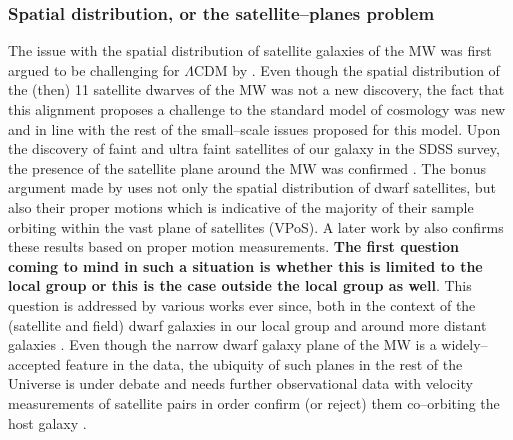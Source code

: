 \documentclass[paper=a4, fontsize=11pt]{scrartcl} %
\numberwithin{equation}{section} %
\numberwithin{figure}{section} %
\numberwithin{table}{section} %
\begin{document}





\subsubsection{Spatial distribution, or the satellite--planes problem}
The issue with the spatial distribution of satellite galaxies of the MW was first argued to be challenging for $\Lambda$CDM by \citet[][]{Ktoupa+2005}. Even though the spatial distribution of the (then) 11 satellite dwarves of the MW was not a new discovery, the fact that this alignment proposes a challenge to the standard model of cosmology was new and in line with the rest of the small--scale issues proposed for this model. Upon the discovery of faint and ultra faint satellites of our galaxy in the SDSS survey, the presence of the satellite plane around the MW was confirmed \citep[][]{Metz+2009, Kroupa+2010}. The bonus argument made by \citet[][]{Metz+2009} uses not only the spatial distribution of dwarf satellites, but also their proper motions which is indicative of the majority of their sample orbiting within the vast plane of satellites (VPoS). A later work by \citet[][]{Pawlowski+2013} also confirms these results based on proper motion measurements. {\bf The first question coming to mind in such a situation is whether this is limited to the local group or this is the case outside the local group as well}. This question is addressed by various works ever since, both in the context of the (satellite and field) dwarf galaxies in our local group \citep[see e.g. ][]{Ibata+2013, Pawlowski+2013, Bellazzini+2013, Pawlowski.McGaugh2014a} and around more distant galaxies \citep[see e.g. ][]{Tully+2015, Muller+2015}. Even though the narrow dwarf galaxy plane of the MW is a widely--accepted feature in the data, the ubiquity of such planes in the rest of the Universe is under debate and needs further observational data with velocity measurements of satellite pairs in order confirm (or reject) them co--orbiting the host galaxy \citet[for opposite views on the matter see e.g. ][]{Phillips+2015, Cautun+2015}.
\end{document}
